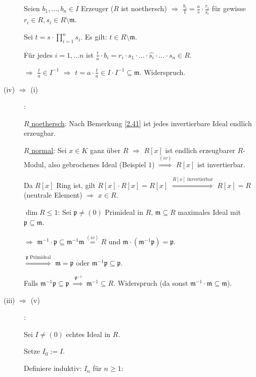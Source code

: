 \begin{Bew}
\begin{description}
Seien $b_1, \ldots, b_n \in I$ Erzeuger ($R$ ist noethersch) $\Rightarrow$
$\frac{b_i}{1} = \frac{a}{s} \cdot \frac{r_i}{s_i}$ f\"ur gewisse $r_i \in R,
s_i \in R \setminus \mathfrak{m}$.

Sei $t = s \cdot \prod_{i=1}^{n} s_i$. Es gilt: $t \in R \setminus \mathfrak{m}$.

F\"ur jedes $i = 1, \ldots n$ ist $\frac{t}{a} \cdot b_i = r_i \cdot s_1 \cdot \ldots \cdot \widehat{s_i} \cdot \ldots \cdot s_n \in R$.

$\Rightarrow$ $\frac{t}{a} \in I^{-1}$ $\Rightarrow$ $t = a \cdot \frac{t}{a} \in I \cdot I^{-1} \subseteq \mathfrak{m}$. Widerspruch.

\item[(iv) $\Rightarrow$ (i)]:

\underline{$R$ noethersch}: Nach Bemerkung \ref{2.41} ist jedes invertierbare Ideal endlich erzeugbar.

\underline{$R$ normal}: Sei $x \in K$ ganz \"uber $R$ $\Rightarrow$ $R[x]$ ist
endlich erzeugbarer $R$-Modul, also gebrochenes Ideal (Beispiel $1$) $\overset{(iv)}{\Rightarrow}$ $R[x]$ ist invertierbar. 

Da $R[x]$ Ring ist, gilt $R[x] \cdot R[x] = R[x]$ $\overset{R[x]\text{ invertierbar}}{\Rightarrow}$ $R[x] = R$ (neutrale Element)
$\Rightarrow$ $x \in R$.

\underline{$\dim R \leq 1$}: Sei $\mathfrak{p} \neq (0)$ Primideal in $R$, $\mathfrak{m} \subseteq R$ maximales Ideal mit $\mathfrak{p} \subseteq \mathfrak{m}$.

$\Rightarrow$ $\mathfrak{m}^{-1} \cdot \mathfrak{p} \subseteq \mathfrak{m}^{-1} \mathfrak{m} \overset{(iv)}{=} R$ und $\mathfrak{m} \cdot (\mathfrak{m}^{-1} \mathfrak{p}) = \mathfrak{p}$.

$\overset{\mathfrak{p}\text{ Primideal}}{\Rightarrow}$ $\mathfrak{m} = \mathfrak{p}$ oder $\mathfrak{m}^{-1} \mathfrak{p} \subseteq \mathfrak{p}$.

Falls $\mathfrak{m}^{-1} \mathfrak{p} \subseteq \mathfrak{p}$ $\overset{\cdot \mathfrak{p}^{-1}}{\Rightarrow}$ $\mathfrak{m}^{-1} \subseteq R$. Widerspruch (da sonst $\mathfrak{m}^{-1} \cdot \mathfrak{m} \subseteq \mathfrak{m}$).

\item[(iii) $\Rightarrow$ (v)]:

Sei $I \neq (0)$ echtes Ideal in $R$.

Setze $I_0 := I$.

Definiere induktiv: $I_n$ f\"ur $n \geq 1$:


\end{description}
\end{Bew}
